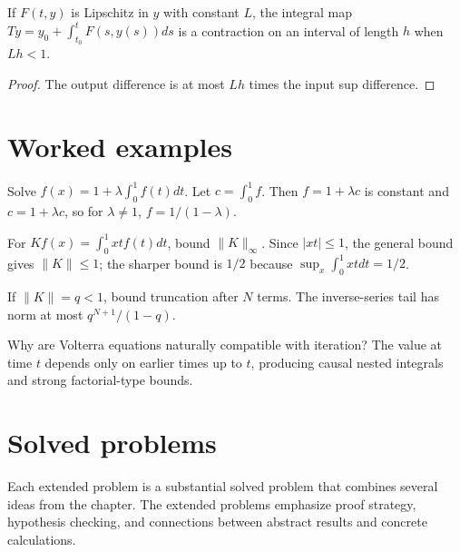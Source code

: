 \begin{theorem}\label{thm:ii18-03}
If $F(t,y)$ is Lipschitz in $y$ with constant $L$, the integral map $Ty=y_0+\int_{t_0}^tF(s,y(s))ds$ is a contraction on an interval of length $h$ when $Lh<1$.
\begin{proof}
The output difference is at most $Lh$ times the input sup difference.
\end{proof}
\end{theorem}

\section{Worked examples}

\begin{example}\label{ex:ii18-worked-01}
Solve $f(x)=1+\lambda\int_0^1f(t)dt$. Let $c=\int_0^1f$. Then $f=1+\lambda c$ is constant and $c=1+\lambda c$, so for $\lambda\ne1$, $f=1/(1-\lambda)$.
\end{example}

\begin{example}\label{ex:ii18-worked-02}
For $Kf(x)=\int_0^1xtf(t)dt$, bound $\|K\|_\infty$. Since $|xt|\le1$, the general bound gives $\|K\|\le1$; the sharper bound is $1/2$ because $\sup_x\int_0^1xtdt=1/2$.
\end{example}

\begin{example}\label{ex:ii18-worked-03}
If $\|K\|=q<1$, bound truncation after $N$ terms. The inverse-series tail has norm at most $q^{N+1}/(1-q)$.
\end{example}

\begin{example}\label{ex:ii18-worked-04}
Why are Volterra equations naturally compatible with iteration? The value at time $t$ depends only on earlier times up to $t$, producing causal nested integrals and strong factorial-type bounds.
\end{example}

\section{Solved problems}
Each extended problem is a substantial solved problem that combines several ideas from the chapter. The extended problems emphasize proof strategy, hypothesis checking, and connections between abstract results and concrete calculations.

